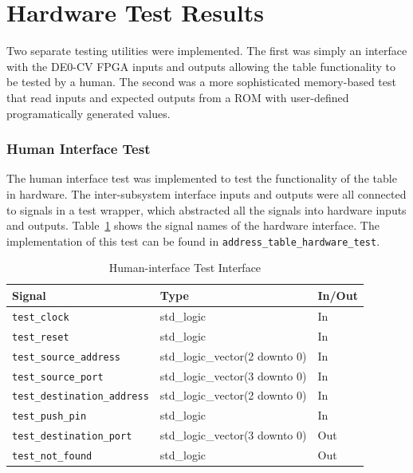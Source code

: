 \documentclass{article}
\begin{document}
\section{Hardware Test Results}

Two separate testing utilities were implemented. The first was simply an interface with the DE0-CV FPGA inputs and outputs allowing the table functionality to be tested by a human. The second was a more sophisticated memory-based test that read inputs and expected outputs from a ROM with user-defined programatically generated values.

\subsubsection{Human Interface Test}

The human interface test was implemented to test the functionality of the table in hardware. The inter-subsystem interface inputs and outputs were all connected to signals in a test wrapper, which abstracted all the signals into hardware inputs and outputs. Table~\ref{tab:test1} shows the signal names of the hardware interface. The implementation of this test can be found in \texttt{address\_table\_hardware\_test}.  

\begin{table}[ht]
    \begin{center}
        \begin{tabular}{lll}\hline
        Signal & Type & In/Out \\
        \hline
        \texttt{test\_clock} & std\_logic & In \\
        \hline
        \texttt{test\_reset} & std\_logic & In \\
        \hline
        \texttt{test\_source\_address} & std\_logic\_vector(2 downto 0) & In \\
        \hline
        \texttt{test\_source\_port} & std\_logic\_vector(3 downto 0) & In \\
        \hline
        \texttt{test\_destination\_address} & std\_logic\_vector(2 downto 0) & In \\
        \hline
        \texttt{test\_push\_pin} & std\_logic & In \\
        \hline
        \texttt{test\_destination\_port} & std\_logic\_vector(3 downto 0) & Out \\
        \hline
        \texttt{test\_not\_found} & std\_logic & Out \\
        \hline
        \end{tabular}
        \caption{Human-interface Test Interface}\label{tab:test1}
    \end{center}
\end{table}
\end{document}
